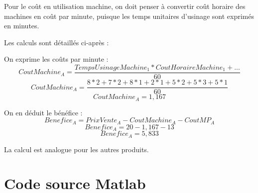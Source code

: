 \documentclass[a4paper,10pt]{article}
\begin{document}
Pour le coût en utilisation machine, on doit penser à convertir coût horaire
des machines en coût par minute, puisque les temps unitaires d'usinage sont
exprimés en minutes.

Les calculs sont détaillés ci-après :

On exprime les coûts par minute :
$$ CoutMachine_A = \frac{TempsUsinageMachine_1*CoutHoraireMachine_1 + ...}{60} $$
$$ CoutMachine_A = \frac{8*2+7*2+8*1+2*1+5*2+5*3+5*1}{60} $$
$$ CoutMachine_A = 1,167 $$

On en déduit le bénéfice :
$$ Benefice_A = PrixVente_A - CoutMachine_A - CoutMP_A $$
$$ Benefice_A = 20 - 1,167 - 13 $$
$$ Benefice_A = 5,833 $$

La calcul est analogue pour les autres produits.


\newpage
\section{Code source Matlab}
\end{document}
